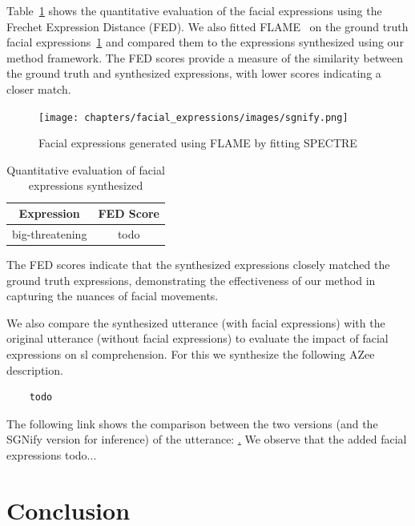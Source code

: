 \documentclass[../../main]{subfiles}
\begin{document}
Table~\ref{tab:facial_expressions_quantitative} shows the quantitative evaluation of the facial expressions using the Frechet Expression Distance (FED). We also fitted FLAME~\cite{FLAME} on the ground truth facial expressions~\ref{ch:facial_expressions:fig:spectre} and compared them to the expressions synthesized using our method framework. The FED scores provide a measure of the similarity between the ground truth and synthesized expressions, with lower scores indicating a closer match.

\begin{figure}
    \centering
    \texttt{[image: chapters/facial\_expressions/images/sgnify.png]}
    \caption{Facial expressions generated using FLAME by fitting SPECTRE}
    \label{ch:facial_expressions:fig:spectre}
\end{figure}

\begin{table}
    \centering
    \begin{tabular}{|c|c|}
        \hline
        \textbf{Expression} & \textbf{FED Score} \\
        \hline
        big-threatening & todo \\
        \hline
    \end{tabular}
    \caption{Quantitative evaluation of facial expressions synthesized}
    \label{tab:facial_expressions_quantitative}
\end{table}

The FED scores indicate that the synthesized expressions closely matched the ground truth expressions, demonstrating the effectiveness of our method in capturing the nuances of facial movements.

We also compare the synthesized utterance (with facial expressions) with the original utterance (without facial expressions) to evaluate the impact of facial expressions on \gls{sl} comprehension. For this we synthesize the following AZee description.

\begin{verbatim}    
    todo
\end{verbatim}

The following link shows the comparison between the two versions (and the SGNify version for inference) of the utterance: \href{todo}. We observe that the added facial expressions todo...

\section{Conclusion}
\label{ch:facial_expressions:conclusion}
\end{document}

